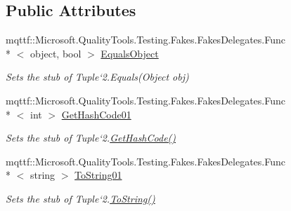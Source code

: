 \subsection*{Public Attributes}
\begin{DoxyCompactItemize}
\item 
mqttf\-::\-Microsoft.\-Quality\-Tools.\-Testing.\-Fakes.\-Fakes\-Delegates.\-Func\\*
$<$ object, bool $>$ \hyperlink{class_system_1_1_fakes_1_1_stub_tuple_3_01_t1_00_01_t2_01_4_a67665131bcc0c553da0de01016924f31}{Equals\-Object}
\begin{DoxyCompactList}\small\item\em Sets the stub of Tuple`2.Equals(\-Object obj)\end{DoxyCompactList}\item 
mqttf\-::\-Microsoft.\-Quality\-Tools.\-Testing.\-Fakes.\-Fakes\-Delegates.\-Func\\*
$<$ int $>$ \hyperlink{class_system_1_1_fakes_1_1_stub_tuple_3_01_t1_00_01_t2_01_4_a246fcac2f6d0ea91eb23f1d3da3e35f6}{Get\-Hash\-Code01}
\begin{DoxyCompactList}\small\item\em Sets the stub of Tuple`2.\hyperlink{class_system_1_1_fakes_1_1_stub_tuple_3_01_t1_00_01_t2_01_4_ac97951511d2e14d82747dca526c23211}{Get\-Hash\-Code()}\end{DoxyCompactList}\item 
mqttf\-::\-Microsoft.\-Quality\-Tools.\-Testing.\-Fakes.\-Fakes\-Delegates.\-Func\\*
$<$ string $>$ \hyperlink{class_system_1_1_fakes_1_1_stub_tuple_3_01_t1_00_01_t2_01_4_a77ba27ccc4d91a7d9173902b1df72eb3}{To\-String01}
\begin{DoxyCompactList}\small\item\em Sets the stub of Tuple`2.\hyperlink{class_system_1_1_fakes_1_1_stub_tuple_3_01_t1_00_01_t2_01_4_ad032f05310dff24e268b8848adbe8d16}{To\-String()}\end{DoxyCompactList}\end{DoxyCompactItemize}
